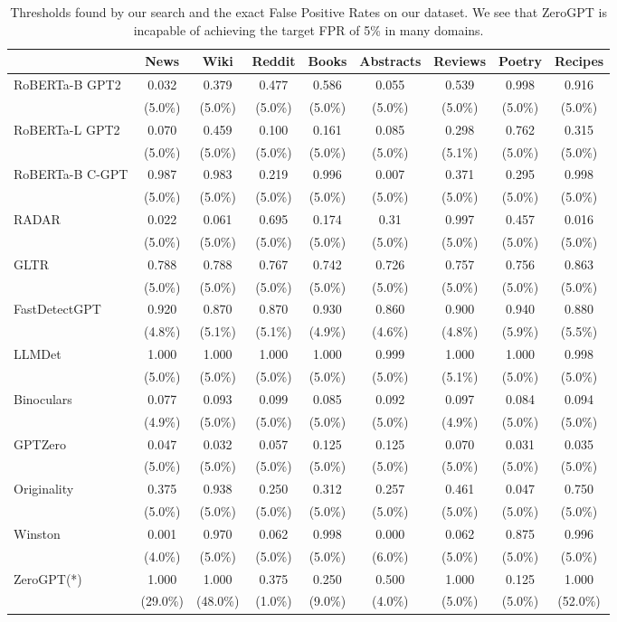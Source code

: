\documentclass[11pt]{article}
\begin{document}
\begin{table}[t]
    \small
    \centering
    \begin{tabular}{l|c|c|c|c|c|c|c|c}
    \toprule 
    &\textbf{News}&\textbf{Wiki}&\textbf{Reddit}&\textbf{Books}&\textbf{Abstracts}&\textbf{Reviews}&\textbf{Poetry}&\textbf{Recipes}\\
    \midrule
    RoBERTa-B GPT2&0.032&0.379&0.477&0.586&0.055&0.539&0.998&0.916\\
    &(5.0\%)&(5.0\%)&(5.0\%)&(5.0\%)&(5.0\%)&(5.0\%)&(5.0\%)&(5.0\%)\\
    RoBERTa-L GPT2&0.070&0.459&0.100&0.161&0.085&0.298&0.762&0.315\\
    &(5.0\%)&(5.0\%)&(5.0\%)&(5.0\%)&(5.0\%)&(5.1\%)&(5.0\%)&(5.0\%)\\
    RoBERTa-B C-GPT&0.987&0.983&0.219&0.996&0.007&0.371&0.295&0.998\\
    &(5.0\%)&(5.0\%)&(5.0\%)&(5.0\%)&(5.0\%)&(5.0\%)&(5.0\%)&(5.0\%)\\
    RADAR&0.022&0.061&0.695&0.174&0.31&0.997&0.457&0.016\\
    &(5.0\%)&(5.0\%)&(5.0\%)&(5.0\%)&(5.0\%)&(5.0\%)&(5.0\%)&(5.0\%)\\
    \midrule
    GLTR&0.788&0.788&0.767&0.742&0.726&0.757&0.756&0.863\\
    &(5.0\%)&(5.0\%)&(5.0\%)&(5.0\%)&(5.0\%)&(5.0\%)&(5.0\%)&(5.0\%)\\
    FastDetectGPT&0.920&0.870&0.870&0.930&0.860&0.900&0.940&0.880\\
    &(4.8\%)&(5.1\%)&(5.1\%)&(4.9\%)&(4.6\%)&(4.8\%)&(5.9\%)&(5.5\%)\\
    LLMDet&1.000&1.000&1.000&1.000&0.999&1.000&1.000&0.998\\
    &(5.0\%)&(5.0\%)&(5.0\%)&(5.0\%)&(5.0\%)&(5.1\%)&(5.0\%)&(5.0\%)\\
    Binoculars&0.077&0.093&0.099&0.085&0.092&0.097&0.084&0.094\\
    &(4.9\%)&(5.0\%)&(5.0\%)&(5.0\%)&(5.0\%)&(4.9\%)&(5.0\%)&(5.0\%)\\
    \midrule
    GPTZero&0.047&0.032&0.057&0.125&0.125&0.070&0.031&0.035\\
    &(5.0\%)&(5.0\%)&(5.0\%)&(5.0\%)&(5.0\%)&(5.0\%)&(5.0\%)&(5.0\%)\\
    Originality&0.375&0.938&0.250&0.312&0.257&0.461&0.047&0.750\\
    &(5.0\%)&(5.0\%)&(5.0\%)&(5.0\%)&(5.0\%)&(5.0\%)&(5.0\%)&(5.0\%)\\
    Winston&0.001&0.970&0.062&0.998&0.000&0.062&0.875&0.996\\
    &(4.0\%)&(5.0\%)&(5.0\%)&(5.0\%)&(6.0\%)&(5.0\%)&(5.0\%)&(5.0\%)\\
    ZeroGPT(*)&1.000&1.000&0.375&0.250&0.500&1.000&0.125&1.000\\
    &(29.0\%)&(48.0\%)&(1.0\%)&(9.0\%)&(4.0\%)&(5.0\%)&(5.0\%)&(52.0\%)\\
    \bottomrule
    \end{tabular}
    \caption{Thresholds found by our search and the exact False Positive Rates on our dataset. We see that ZeroGPT is incapable of achieving the target FPR of 5\% in many domains.}
    \label{tab:thresholds}
\end{table}
\end{document}

